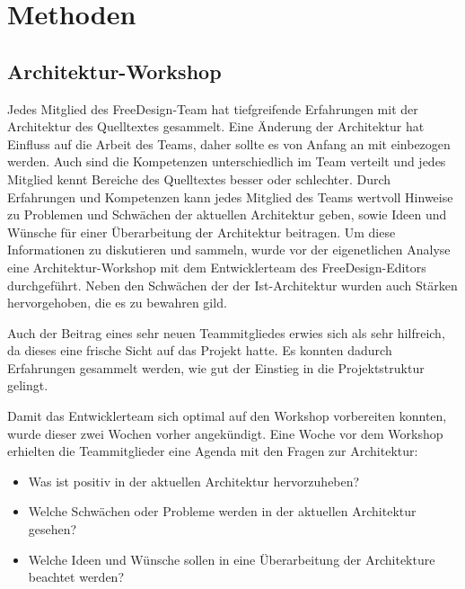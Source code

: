 \chapter{Methoden}

\section{Architektur-Workshop}
Jedes Mitglied des FreeDesign-Team hat tiefgreifende Erfahrungen mit der Architektur des Quelltextes gesammelt. %
Eine Änderung der Architektur hat Einfluss auf die Arbeit des Teams, daher sollte es von Anfang an mit einbezogen werden. 
Auch sind die Kompetenzen unterschiedlich im Team verteilt und jedes Mitglied kennt Bereiche des Quelltextes besser oder schlechter. 
Durch Erfahrungen und Kompetenzen kann jedes Mitglied des Teams wertvoll Hinweise zu Problemen und Schwächen der aktuellen Architektur geben, sowie Ideen und Wünsche für einer Überarbeitung der Architektur beitragen.
Um diese Informationen zu diskutieren und sammeln, wurde vor der eigenetlichen Analyse eine Architektur-Workshop mit dem Entwicklerteam des FreeDesign-Editors durchgeführt. Neben den Schwächen der der Ist-Architektur wurden auch Stärken hervorgehoben, die es zu bewahren gild. 

Auch der Beitrag eines sehr neuen Teammitgliedes erwies sich als sehr hilfreich, da dieses eine frische Sicht auf das Projekt hatte. Es konnten dadurch Erfahrungen gesammelt werden, wie gut der Einstieg in die Projektstruktur gelingt. 

Damit das Entwicklerteam sich optimal auf den Workshop vorbereiten konnten, wurde dieser zwei Wochen vorher angekündigt. Eine Woche vor dem Workshop erhielten die Teammitglieder eine Agenda mit den Fragen zur Architektur:
\begin{itemize}
	\item Was ist positiv in der aktuellen Architektur hervorzuheben?
	\item Welche Schwächen oder Probleme werden in der aktuellen Architektur gesehen?
	\item Welche Ideen und Wünsche sollen in eine Überarbeitung der Architekture beachtet werden?
\end{itemize}


